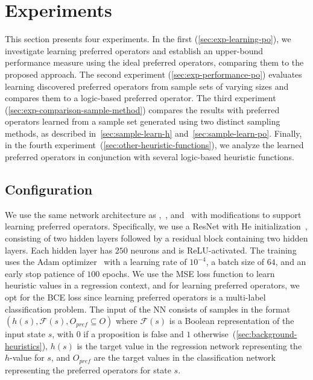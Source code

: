\documentclass[ppgc,diss,english]{iiufrgs}
\begin{document}
\chapter{Experiments}
\label{cha:exp-experiments}
This section presents four experiments. In the first (\cref{sec:exp-learning-po}), we investigate learning preferred operators and establish an upper-bound performance measure using the ideal preferred operators, comparing them to the proposed approach. The second experiment (\cref{sec:exp-performance-po}) evaluates learning discovered preferred operators from sample sets of varying sizes and compares them to a logic-based preferred operator. The third experiment (\cref{sec:exp-comparison-sample-method}) compares the results with preferred operators learned from a sample set generated using two distinct sampling methods, as described in~\cref{sec:sample-learn-h} and~\cref{sec:sample-learn-po}. Finally, in the fourth experiment~(\cref{sec:other-heuristic-functions}), we analyze the learned preferred operators in conjunction with several logic-based heuristic functions.

\section{Configuration}
\label{sec:exp-configuration}

We use the same network architecture as \citet{Ferber.etal/2022},~\citet{OToole/2022}, and~\citet{Bettker.etal/2022} with modifications to support learning preferred operators. Specifically, we use a ResNet with He initialization~\cite{He.etal/2015}, consisting of two hidden layers followed by a residual block containing two hidden layers.
Each hidden layer has $250$ neurons and is ReLU-activated.
The training uses the Adam optimizer~\cite{Kingma.Ba/2015} with a learning rate of $10^{-4}$, a batch size of $64$, and an early stop patience of $100$ epochs.
We use the MSE loss function to learn heuristic values in a regression context, and for learning preferred operators, we opt for the BCE loss since learning preferred operators is a multi-label classification problem.
The input of the NN consists of samples in the format $(h(s), \mathcal{F}(s), O_{pref} \subseteq O)$
where $\mathcal{F}(s)$ is a Boolean representation of the input state $s$, with $0$ if a proposition is false and $1$ otherwise~(\cref{sec:background-heuristics}), $h(s)$ is the target value in the regression network representing the $h$-value for $s$, and $O_{pref}$ are the target values in the classification network representing the preferred operators for state $s$.
\end{document}
